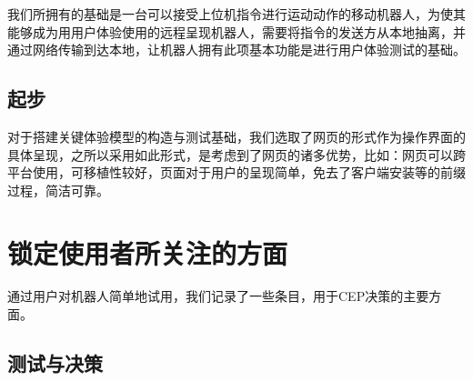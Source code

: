 我们所拥有的基础是一台可以接受上位机指令进行运动动作的移动机器人，为使其能够成为用用户体验使用的远程呈现机器人，需要将指令的发送方从本地抽离，并通过网络传输到达本地，让机器人拥有此项基本功能是进行用户体验测试的基础。

\subsection{起步}

对于搭建关键体验模型的构造与测试基础，我们选取了网页的形式作为操作界面的具体呈现，之所以采用如此形式，是考虑到了网页的诸多优势，比如：网页可以跨平台使用，可移植性较好，页面对于用户的呈现简单，免去了客户端安装等的前缀过程，简洁可靠。

\section{锁定使用者所关注的方面}

通过用户对机器人简单地试用，我们记录了一些条目，用于CEP决策的主要方面。

\subsection{测试与决策}

